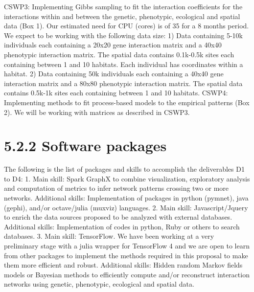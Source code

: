 \documentclass[12pt]{article}
\begin{document}
\begin{center}
CSWP3: Implementing Gibbs sampling to fit the interaction coefficients for the interactions
within and between the genetic, phenotypic, ecological and spatial data (Box 1). Our estimated
need for CPU (cores) is of 35 for a 8 months period.
We expect to be working with the following data size:
1) Data containing 5-10k individuals each containing a 20x20 gene interaction matrix and a
40x40 phenotypic interaction matrix. The spatial data contains 0.1k-0.5k sites each containing
between 1 and 10 habitats. Each individual has coordinates within a habitat.
2) Data containing 50k individuals each containing a 40x40 gene interaction matrix and a
80x80 phenotypic interaction matrix. The spatial data contains 0.5k-1k sites each containing
between 1 and 10 habitats.
CSWP4: Implementing methods to fit process-based models to the empirical patterns (Box 2).
We will be working with matrices as described in CSWP3.

\section*{5.2.2 Software packages}

The following is the list of packages and skills to accomplish the deliverables D1 to D4:
1. Main skill: Spark GraphX to combine visualization, exploratory analysis and computation of
metrics to infer network patterns crossing two or more networks.
Additional skills: Implementation of packages in python (pymnet), java (gephi), and/or
octave/julia (muxviz) languages.
2. Main skill: Javascript/Jquery to enrich the data sources proposed to be analyzed with
external databases.
Additional skills: Implementation of codes in python, Ruby or others to search databases.
3. Main skill: TensorFlow. We have been working at a very preliminary stage with a julia
wrapper for TensorFlow 4 and we are open to learn from other packages to implement the
methods required in this proposal to make them more efficient and robust.
Additional skills: Hidden random Markov fields models or Bayesian methods to efficiently
compute and/or reconstruct interaction networks using genetic, phenotypic, ecological and
spatial data.


\end{center}
\end{document}
